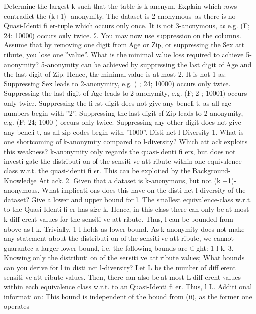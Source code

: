


Determine the largest k such that the table is k-anonym. Explain which rows contradict the (k+1)-
anonymity. The dataset is 2-anonymous, as there is no Quasi-Identi fi er-tuple which occurs only once.
It is not 3-anonymous, as e.g. (F; 24; 10000) occurs only twice.
2. You may now use suppression on the columns. Assume that by removing one digit from Age or Zip,
or suppressing the Sex att ribute, you lose one ”value”. What is the minimal value loss required to
achieve 5-anonymity?
5-anonymity can be achieved by suppressing the last digit of Age and the last digit of Zip. Hence,
the minimal value is at most 2. It is not 1 as:
Suppressing Sex leads to 2-anonymity, e.g. ( ; 24; 10000) occurs only twice.
Suppressing the last digit of Age leads to 2-anonymity, e.g. (F; 2 ; 10001) occurs only twice.
Suppressing the fi rst digit does not give any benefi t, as all age numbers begin with ”2”.
Suppressing the last digit of Zip leads to 2-anonymity, e.g. (F; 24; 1000 ) occurs only twice.
Suppressing any other digit does not give any benefi t, as all zip codes begin with ”1000”.
Disti nct l-Diversity
1. What is one shortcoming of k-anonymity compared to l-diversity? Which att ack exploits this weakness?
k-anonymity only regards the quasi-identi fi ers, but does not investi gate the distributi on of the sensiti ve
att ribute within one equivalence-class w.r.t. the quasi-identi fi er. This can be exploited by the
Background-Knowledge Att ack.
2. Given that a dataset is k-anonymous, but not (k +1)-anonymous. What implicati ons does this have
on the disti nct l-diversity of the dataset? Give a lower and upper bound for l.
The smallest equivalence-class w.r.t. to the Quasi-Identi fi er has size k. Hence, in this class there
can only be at most k diff erent values for the sensiti ve att ribute. Thus, l can be bounded from above
as l k. Trivially, 1 l holds as lower bound. As k-anonymity does not make any statement
about the distributi on of the sensiti ve att ribute, we cannot guarantee a larger lower bound, i.e. the
following bounds are ti ght: 1 l k.
3. Knowing only the distributi on of the sensiti ve att ribute values; What bounds can you derive for l in
disti nct l-diversity?
Let L be the number of diff erent sensiti ve att ribute values. Then, there can also be at most L diff erent
values within each equivalence class w.r.t. to an Quasi-Identi fi er. Thus, l L.
Additi onal informati on: This bound is independent of the bound from (ii), as the former one operates
